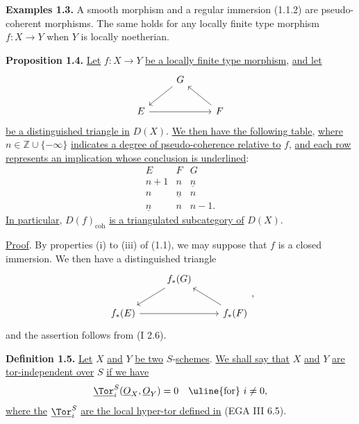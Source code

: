 \textbf{Examples 1.3.} A smooth morphism and a regular immersion (1.1.2) are pseudo-coherent morphisms. The same holds for any locally finite type morphism \(f:X\to Y\) when \(Y\) is locally noetherian.

\textbf{Proposition 1.4.} \uline{Let} \(f:X\to Y\) \uline{be a locally finite type morphism}, \uline{and let}
\[
\begin{tikzcd}
& G \arrow[dl] & \\
E \arrow[rr] && F \arrow[ul]
\end{tikzcd}
\]
\uline{be a distinguished triangle in} \(D(X)\). \uline{We then have the following table}, \uline{where} \(n\in\mathbb Z\cup\{-\infty\}\) \uline{indicates a degree of pseudo-coherence relative to} \(f\), \uline{and each row represents an implication whose conclusion is underlined}:
\[
\begin{array}{ccc}
E&F&G\\
n+1&n&\underline n\\
n&\underline n&n\\
\underline n&n&n-1.
\end{array}
\]
\uline{In particular}, \(D(f)_{\mathrm{coh}}\) \uline{is a triangulated subcategory of} \(D(X)\).

\uline{Proof}. By properties (i) to (iii) of (1.1), we may suppose that \(f\) is a closed immersion. We then have a distinguished triangle
\[
\begin{tikzcd}
& f_*(G) \arrow[dl] & \\
f_*(E) \arrow[rr] && f_*(F) \arrow[ul]
\end{tikzcd},
\]
and the assertion follows from (I 2.6).

\textbf{Definition 1.5.} \uline{Let} \(X\) \uline{and} \(Y\) \uline{be two} \(S\)-\uline{schemes}. \uline{We shall say that} \(X\) \uline{and} \(Y\) \uline{are tor-independent over} \(S\) \uline{if we have}
\[
  \underline{\Tor}_i^S(\underline{O}_X,\underline{O}_Y)=0\quad\text{\uline{for} }i\ne 0,
\]
\uline{where the} \(\underline{\Tor}_i^S\) \uline{are the local hyper-tor defined in} (EGA III 6.5).

